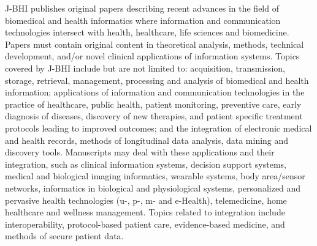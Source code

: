 J-BHI publishes original papers describing recent advances in the field of biomedical and health informatics where information and communication technologies intersect with health, healthcare, life sciences and biomedicine.  Papers must contain original content in theoretical analysis, methods, technical development, and/or novel clinical applications of information systems. Topics covered by J-BHI include but are not limited to: acquisition, transmission, storage, retrieval, management, processing and analysis of biomedical and health information; applications of information and communication technologies in the practice of healthcare, public health, patient monitoring, preventive care, early diagnosis of diseases,  discovery of new therapies, and patient specific treatment protocols leading to improved outcomes; and the integration of electronic medical and health records, methods of longitudinal data analysis, data mining and discovery tools. Manuscripts may deal with these applications and their integration, such as clinical information systems,  decision support systems, medical and biological imaging informatics,  wearable  systems, body area/sensor networks, informatics in biological and physiological systems,  personalized and pervasive health  technologies (u-, p-, m- and e-Health), telemedicine, home healthcare and wellness management. Topics related to integration include interoperability, protocol-based patient care, evidence-based medicine, and methods of secure patient data.~\cite{JBHI}















